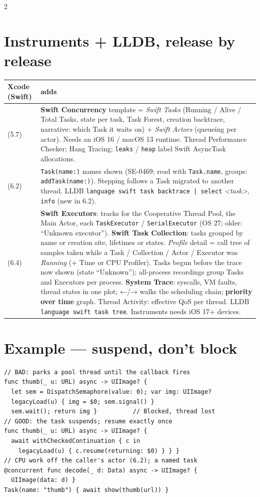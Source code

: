 \documentclass[8pt]{extarticle}
\begin{document}
\begin{multicols}{2}
\section{Instruments + LLDB, release by release}
{\footnotesize\setlength{\tabcolsep}{2.5pt}
\begin{tabular}{@{}>{\raggedright\arraybackslash}p{11mm}>{\raggedright\arraybackslash}p{65mm}@{}}
\toprule
\textbf{Xcode (Swift)} & \textbf{adds} \\
\midrule
14 (5.7) &\textbf{Swift Concurrency} template = \emph{Swift Tasks} (Running / Alive / Total
  Tasks, state per task, Task Forest, creation backtrace, narrative: which Task it waits on) +
  \emph{Swift Actors} (queueing per actor). Needs an iOS 16 / macOS 13 runtime. Thread
  Performance Checker; Hang Tracing; \texttt{leaks} / \texttt{heap} label Swift AsyncTask
  allocations. \\
26 (6.2) & \texttt{Task(name:)} names shown (SE-0469; read with \texttt{Task.name},
  groups: \texttt{addTask(name:)}). Stepping follows a Task migrated to another thread. LLDB
  \texttt{language swift task backtrace | select} \emph{<task>}, \texttt{info} (new in 6.2). \\
27 (6.4) & \textbf{Swift Executors}: tracks for the Cooperative Thread Pool, the Main Actor, each
  \texttt{TaskExecutor} / \texttt{SerialExecutor} (OS 27; older: ``Unknown executor'').
  \textbf{Swift Task Collection}: tasks grouped by name or creation site, lifetimes or states.
  \emph{Profile} detail = call tree of samples taken while a Task / Collection / Actor / Executor
  was \emph{Running} (+ Time or CPU Profiler). Tasks begun before the trace now shown (state
  ``Unknown''); all-process recordings group Tasks and Executors per process. \textbf{System Trace}: syscalls, VM faults, thread states in one plot; ←/→ walks
  the scheduling chain; \textbf{priority over time} graph. Thread Activity: effective QoS per thread.
  LLDB \texttt{language swift task tree}. Instruments needs iOS 17+ devices. \\
\bottomrule
\end{tabular}}

\columnbreak

\section{Example — suspend, don't block}
\begin{lstlisting}[language=SwiftSheet]
// BAD: parks a pool thread until the callback fires
func thumb(_ u: URL) async -> UIImage? {
  let sem = DispatchSemaphore(value: 0); var img: UIImage?
  legacyLoad(u) { img = $0; sem.signal() }
  sem.wait(); return img }          // Blocked, thread lost
// GOOD: the task suspends; resume exactly once
func thumb(_ u: URL) async -> UIImage? {
  await withCheckedContinuation { c in
    legacyLoad(u) { c.resume(returning: $0) } } }
// CPU work off the caller's actor (6.2); a named task
@concurrent func decode(_ d: Data) async -> UIImage? {
  UIImage(data: d) }
Task(name: "thumb") { await show(thumb(url)) }
\end{lstlisting}


\end{multicols}
\end{document}
